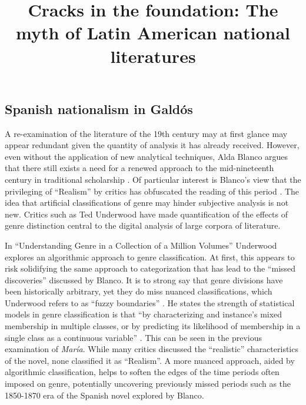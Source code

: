\documentclass[12pt]{report}
\title{Cracks in the foundation: The myth of Latin American national literatures}
\begin{document}

\begin{singlespace}
	\chapter{Spanish nationalism in Galdós}
\end{singlespace}

A re-examination of the literature of the 19th century may at first glance may appear redundant given the quantity of analysis it has already received. 
However, even without the application of new analytical techniques, Alda Blanco argues that there still exists a need for a renewed approach to the mid-nineteenth century in traditional scholarship \cite[423]{Blanco2000}.
Of particular interest is Blanco's view that the privileging of \enquote{Realism} by critics has obfuscated the reading of this period \cite[433]{Blanco2000}.
The idea that artificial classifications of genre may hinder subjective analysis is not new.
Critics such as Ted Underwood have made quantification of the effects of genre distinction central to the digital analysis of large corpora of literature. 

In \enquote{Understanding Genre in a Collection of a Million Volumes} Underwood explores an algorithmic approach to genre classification. 
At first, this appears to risk solidifying the same approach to categorization that has lead to the \enquote{missed discoveries} discussed by Blanco.
It is to strong say that genre divisions have been historically arbitrary, yet they do miss nuanced classifications, which Underwood refers to as \enquote{fuzzy boundaries} \cite[9]{Underwood2014}.
He states the strength of statistical models in genre classification is that \enquote{by characterizing and instance's mixed membership in multiple classes, or by predicting its likelihood of membership in a single class as a continuous variable} \cite[9]{Underwood2014}.
This can be seen in the previous examination of \textit{María}.
While many critics discussed the \enquote{realistic} characteristics of the novel, none classified it as \enquote{Realism}.
A more nuanced approach, aided by algorithmic classification, helps to soften the edges of the time periods often imposed on genre, potentially uncovering previously missed periods such as the 1850-1870 era of the Spanish novel explored by Blanco.
\end{document}
